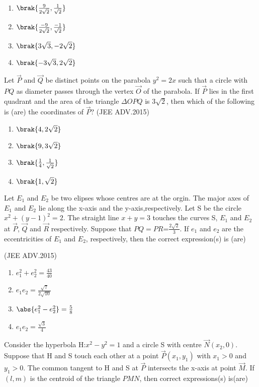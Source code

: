 		 \begin{enumerate}
			\item $\brak{\frac{9}{2\sqrt{2}},\frac{1}{\sqrt{2}}}$ 
			\item $ \brak{\frac{-9}{2\sqrt{2}},\frac{-1}{\sqrt{2}}}$
			\item $\brak{3\sqrt{3},-2\sqrt{2}}$
			\item $ \brak{-3\sqrt{3},2\sqrt{2}}$
		
		 \end{enumerate}

	\item Let $\vec{P}$ and $\vec{Q}$ be distinct points on the parabola $y^2=2x$ such 
		that a circle with $PQ$ as diameter passes through the vertex
		$\vec{O}$ of the parabola. If $\vec{P}$ lies in the first quadrant and the area
		of the triangle  \(\Delta \)$OPQ$ is 3$\sqrt{2}$, then which of the following is
		(are) the coordinates of $\vec{P}$?  
		\hfill(JEE ADV.2015)
		
		 \begin{enumerate}
			\item $ \brak{4,2\sqrt{2}}$
			\item $\brak{9,3\sqrt{2}}$
			\item $ \brak{\frac{1}{4},\frac{1}{\sqrt{2}}}$
			\item  $ \brak{1,\sqrt{2}}$
		 \end{enumerate}
	\item Let $ E_1$  and $ E_2$ be two elipses whose centres are at the orgin.
              The major axes of $E_1$ and $ E_2$ lie along the x-axis and the
              y-axis,respectively. Let S be the circle $x^2+(y-1)^2=2$. The
		straight line $x+y=3$ touches the curves S, $E_1$ and $E_2$ at $\vec{P}$, $\vec{Q}$
		and $\vec{R}$ respectively. Suppose that $PQ=PR$=$\frac{2\sqrt{2}}{3}$. If $e_1$ and
              $e_2$ are the eccentricities of $E_1$ and $E_2$, respectively, then the 
              correct expression(s) is (are) 
	        
		\hfill(JEE ADV.2015)
		
		 \begin{enumerate}
			\item $e_1^2+e_2^2=\frac{43}{40}$
			\item $e_1e_2=\frac{\sqrt{7}}{2\sqrt{10}}$
			\item $\abs{ e_1^2-e_2^2}=\frac{5}{8}$
			\item $e_1e_2=\frac{\sqrt{3}}{4}$ 
		 \end{enumerate}
	\item Consider the hyperbola H:$x^2-y^2=1$ and a circle S with 
		centre $\vec{N}(x_2,0)$. Suppose that H and S touch each other at a 
	      point $\vec{P}(x_1,y_1)$ with $x_1>0$ and $y_1>0$. The common tangent to H and S at $\vec{P}$ intersects the x-axis at point $\vec{M}$. If $(l,m)$ is the centroid of the triangle $PMN$, then correct expressions(s) is(are)
	      
